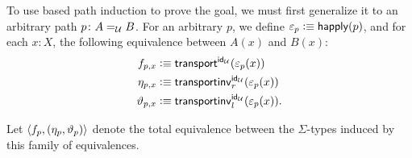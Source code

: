 \begin{solution}
\begin{enumerate}[a),font=\upshape]
\begin{enumerate}
            To use based path induction to prove the goal, we must first generalize it to an arbitrary path $p\colon A\eq\univ B$. For an arbitrary $p$, we define $\varepsilon_p\mathrel{\vcentcolon}\equiv\mathsf{happly}(p)$, and for each $x\colon X$, the following equivalence between $A(x)$ and $B(x)$:
            \begin{align*}
                f_{p,x}
                    &\mathrel{\vcentcolon}\equiv\mathsf{transport}^{\mathsf{id}_\mathcal U}
                        (\varepsilon_p(x))\\
                \eta_{p,x}
                    &\mathrel{\vcentcolon}\equiv\mathsf{transportinv}_r^{\mathsf{id}_\mathcal U}
                        (\varepsilon_p(x))\\
                \vartheta_{p,x}
                    &\mathrel{\vcentcolon}\equiv\mathsf{transportinv}_l^{\mathsf{id}_\mathcal U}
                        (\varepsilon_p(x)).
            \end{align*}
            
            Let $\langle f_p,(\eta_p,\vartheta_p)\rangle$ denote the total equivalence between the $\Sigma$-types induced by this family of equivalences.
            

\end{enumerate}
\end{enumerate}
\end{solution}
